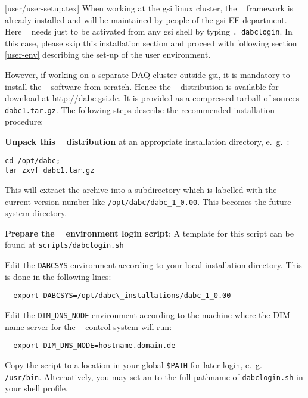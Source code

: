 [user/user-setup.tex]
When working at the gsi linux cluster, the \dabc~ framework is already installed and will
be maintained by people of the gsi EE department. Here \dabc~ needs just to be
activated from any gsi shell by typing {\tt . dabclogin}. In this case, 
please skip this installation section and proceed with following section \ref{user-env} describing
the set-up of the user environment.

However, if working on a separate DAQ cluster outside gsi, 
it is mandatory to install the \dabc~ software
from scratch. 
Hence the \dabc~ distribution is available for download at \hyperref{http://dabc.gsi.de}{}{}{http://dabc.gsi.de}.
It is provided as a compressed tarball of sources {\tt dabc1.tar.gz}.
The following steps describe the recommended installation procedure:

\bnum
\item {\bf Unpack this \dabc~ distribution} at an appropriate installation directory,
e.~g.~:
\begin{verbatim}
cd /opt/dabc; 
tar zxvf dabc1.tar.gz
\end{verbatim}
This will extract the archive into a subdirectory which is labelled
with the current version number like {\tt /opt/dabc/dabc\_1\_0.00}.
This becomes the future \dabc~ system directory.

\item {\bf Prepare the \dabc~ environment login script}:
A template for this script can be found at {\tt scripts/dabclogin.sh}
\bbul
  \item Edit the {\tt DABCSYS} environment according to your local installation directory. 
  This is done in the following lines:
  \begin{verbatim}
  export DABCSYS=/opt/dabc\_installations/dabc_1_0.00  
  \end{verbatim}  
  
  \item Edit the {\tt DIM\_DNS\_NODE} environment according to the machine where 
  the DIM name server \cite{DIM} for the \dabc~ control system will run:
   \begin{verbatim}
  export DIM_DNS_NODE=hostname.domain.de
  \end{verbatim}  
  \item Copy the script to a location in your global {\tt \$PATH} for later login,
  e.~g.~ {\tt /usr/bin}. Alternatively, you
  may set an  to the full pathname of {\tt dabclogin.sh} in your shell profile.
\ebul


